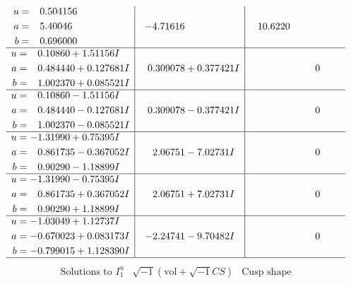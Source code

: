\documentclass[1p]{elsarticle_modified}
\theoremstyle{definition}
\newcommand{\I}{\sqrt{-1}}
\begin{document}
$$\begin{array}{c|c|c}
\begin{aligned}
u &= \phantom{-}0.504156\phantom{ +0.000000I} \\
a &= \phantom{-}5.40046\phantom{ +0.000000I} \\
b &= \phantom{-}0.696000\phantom{ +0.000000I}\end{aligned}
 & -4.71616\phantom{ +0.000000I} & \phantom{-}10.6220\phantom{ +0.000000I} \\ \hline\begin{aligned}
u &= \phantom{-}0.10860 + 1.51156 I \\
a &= \phantom{-}0.484440 + 0.127681 I \\
b &= \phantom{-}1.002370 + 0.085521 I\end{aligned}
 & \phantom{-}0.309078 + 0.377421 I & \phantom{-0.000000 } 0 \\ \hline\begin{aligned}
u &= \phantom{-}0.10860 - 1.51156 I \\
a &= \phantom{-}0.484440 - 0.127681 I \\
b &= \phantom{-}1.002370 - 0.085521 I\end{aligned}
 & \phantom{-}0.309078 - 0.377421 I & \phantom{-0.000000 } 0 \\ \hline\begin{aligned}
u &= -1.31990 + 0.75395 I \\
a &= \phantom{-}0.861735 - 0.367052 I \\
b &= \phantom{-}0.90290 - 1.18899 I\end{aligned}
 & \phantom{-}2.06751 - 7.02731 I & \phantom{-0.000000 } 0 \\ \hline\begin{aligned}
u &= -1.31990 - 0.75395 I \\
a &= \phantom{-}0.861735 + 0.367052 I \\
b &= \phantom{-}0.90290 + 1.18899 I\end{aligned}
 & \phantom{-}2.06751 + 7.02731 I & \phantom{-0.000000 } 0 \\ \hline\begin{aligned}
u &= -1.03049 + 1.12737 I \\
a &= -0.670023 + 0.083173 I \\
b &= -0.799015 + 1.128390 I\end{aligned}
 & -2.24741 - 9.70482 I & \phantom{-0.000000 } 0\\
 \hline 
 \end{array}$$\newpage$$\begin{array}{c|c|c}  
\text{Solutions to }I^u_{1}& \I (\text{vol} + \sqrt{-1}CS) & \text{Cusp shape}\\

\end{array}$$
\end{document}
